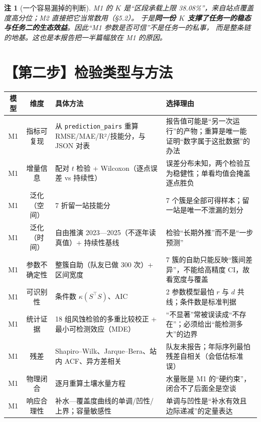 \documentclass[11pt,a4paper]{ctexart}
\newtheorem{remark}{注}
\begin{document}
\begin{remark}[一个容易漏掉的判断]
M1 的 $K$ 是“区段承载上限 38.08\%”，来自站点覆盖度高分位；M2 直接把它当常数用（\S5.2）。
于是\textbf{同一份 $K$ 支撑了任务一的稳态与任务二的生态效益}。因此“M1 参数是否可信”不是任务一的私事，
而是整条链的地基。这也是本报告把一半篇幅放在 M1 的原因。
\end{remark}

\section{【第二步】检验类型与方法}

\begin{table}[htbp]\centering\footnotesize
\begin{tabularx}{\textwidth}{|c|c|X|X|}
\toprule
模型 & 维度 & 具体方法 & 选择理由 \\
\midrule
M1 & 指标可复现 & 从 \texttt{prediction\_pairs} 重算 RMSE/MAE/R²/技能分，与 JSON 对表 & 报告值可能是“另一次运行”的产物；重算是唯一能证明“数字属于这批数据”的办法 \\
M1 & 增量信息 & 配对 $t$ 检验 + Wilcoxon（逐点误差 vs 持续性） & 误差分布未知，两个检验互为稳健性；单看均值会掩盖逐点胜负 \\
M1 & 泛化（空间） & 7 折留一站技能分 & 7 个簇是全部可得样本；留一站是唯一不泄漏的划分 \\
M1 & 泛化（时间） & 自由推演 2023—2025（不逐年读真值）+ 持续性基线 & 检验“长期外推”而不是“一步预测” \\
M1 & 参数不确定性 & 整簇自助（队友已做 300 次）+ 区间宽度 & 7 簇的自助只能反映“簇间差异”，不能给高精度 CI，故看宽度与覆盖 \\
M1 & 可识别性 & 条件数 $\kappa(S^{\top}S)$、AIC & 2 参数模型最怕 $r$ 与 $d$ 共线；条件数是标准判据 \\
M1 & 统计证据 & 18 组风蚀检验的多重比较校正 + 最小可检测效应（MDE） & “不显著”常被误读成“不存在”；必须给出“能检测多大”的边界 \\
M1 & 残差 & Shapiro–Wilk、Jarque–Bera、站内 ACF、异方差相关 & 队友未报告；年际序列最怕残差自相关（会低估标准误） \\
M1 & 物理闭合 & 逐月重算土壤水量方程 & 水量账是 M1 的“硬约束”，闭合不了后面全是空谈 \\
M1 & 响应合理性 & 补水—覆盖度曲线的单调/凹性/上界；容量敏感性 & 单调与凹性是“补水有效且边际递减”的定量表达 \\

\end{tabularx}
\end{table}
\end{document}
